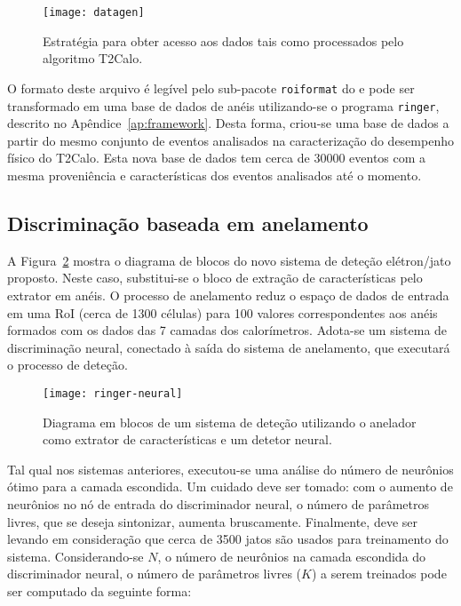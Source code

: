 \begin{figure}
\begin{center}
\texttt{[image: datagen]}
\end{center}
\caption{Estratégia para obter acesso aos dados tais como processados pelo
algoritmo T2Calo.}
\label{fig:datagen}
\end{figure}

O formato deste arquivo é legível pelo sub-pacote \texttt{roiformat} do
 e pode ser transformado em uma base de dados de anéis
utilizando-se o programa \texttt{ringer}, descrito no
Apêndice~\ref{ap:framework}. Desta forma, criou-se uma base de dados a partir
do mesmo conjunto de eventos analisados na caracterização do desempenho físico
do T2Calo. Esta nova base de dados tem cerca de $30000$ eventos com a mesma
proveniência e características dos eventos analisados até o momento.

\subsection{Discriminação baseada em anelamento}

A Figura~\ref{fig:ringer-neural} mostra o diagrama de blocos do novo sistema
de deteção elétron/jato proposto. Neste caso, substitui-se o bloco de extração
de características pelo extrator em anéis. O processo de anelamento reduz o
espaço de dados de entrada em uma RoI (cerca de 1300 células) para 100 valores
correspondentes aos anéis formados com os dados das 7 camadas dos
calorímetros. Adota-se um sistema de discriminação neural, conectado à saída
do sistema de anelamento, que executará o processo de deteção.

\begin{figure}
\begin{center}
\texttt{[image: ringer-neural]}
\end{center}
\caption{Diagrama em blocos de um sistema de deteção utilizando o anelador
como extrator de características e um detetor neural.}
\label{fig:ringer-neural}
\end{figure}

Tal qual nos sistemas anteriores, executou-se uma análise do número de
neurônios ótimo para a camada escondida. Um cuidado deve ser tomado: com o
aumento de neurônios no nó de entrada do discriminador neural, o número de
parâmetros livres, que se deseja sintonizar, aumenta bruscamente. Finalmente,
deve ser levando em consideração que cerca de 3500 jatos são usados para
treinamento do sistema. Considerando-se $N$, o número de neurônios na camada
escondida do discriminador neural, o número de parâmetros livres ($K$) a serem
treinados pode ser computado da seguinte forma:

